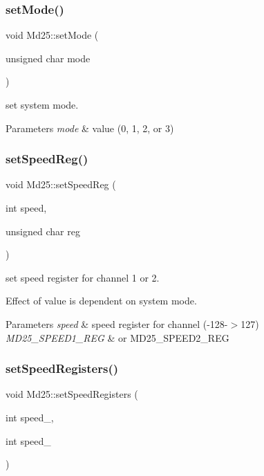\subsubsection{\texorpdfstring{set\+Mode()}{setMode()}}
{\footnotesize\ttfamily void Md25\+::set\+Mode (\begin{DoxyParamCaption}\item[{unsigned char}]{mode }\end{DoxyParamCaption})}



set system mode. 


\begin{DoxyParams}{Parameters}
{\em mode} & value (0, 1, 2, or 3) \\
\hline
\end{DoxyParams}
\mbox{\label{classMd25_a2f3b787d1ba19a791f9256898fca1413}} 
\subsubsection{\texorpdfstring{set\+Speed\+Reg()}{setSpeedReg()}}
{\footnotesize\ttfamily void Md25\+::set\+Speed\+Reg (\begin{DoxyParamCaption}\item[{int}]{speed,  }\item[{unsigned char}]{reg }\end{DoxyParamCaption})}



set speed register for channel 1 or 2. 

Effect of value is dependent on system mode.


\begin{DoxyParams}{Parameters}
{\em speed} & speed register for channel (-\/128-\/$>$127) \\
\hline
{\em M\+D25\+\_\+\+S\+P\+E\+E\+D1\+\_\+\+R\+EG} & or M\+D25\+\_\+\+S\+P\+E\+E\+D2\+\_\+\+R\+EG \\
\hline
\end{DoxyParams}
\mbox{\label{classMd25_a47d84a3612a8a59db1b48165eb143253}} 
\subsubsection{\texorpdfstring{set\+Speed\+Registers()}{setSpeedRegisters()}}
{\footnotesize\ttfamily void Md25\+::set\+Speed\+Registers (\begin{DoxyParamCaption}\item[{int}]{speed\+\_,  }\item[{int}]{speed\+\_ }\end{DoxyParamCaption})}



